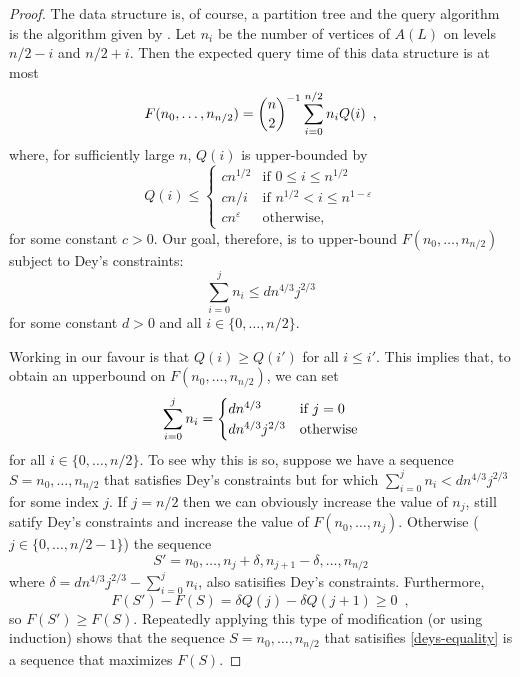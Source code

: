 \documentclass{patmorin}
\newcommand{\eps}{\varepsilon}
\begin{document}
\begin{proof}
  The data structure is, of course, a partition tree and the query
  algorithm is the algorithm given by .  Let $n_i$
  be the number of vertices of $A(L)$ on levels $n/2-i$ and $n/2+i$.
  Then the expected query time of this data structure is at most
  \begin{equation}
    F(n_0,\ldots,n_{n/2}) 
      = \binom{n}{2}^{-1}\sum_{i=0}^{n/2} n_i Q(i) \enspace ,
     \eqlabel{expected}
  \end{equation}
  where, for sufficiently large $n$, $Q(i)$ is upper-bounded by
  \[
        Q(i) \le \begin{cases}
          cn^{1/2} & \text{if $0\le i \le n^{1/2}$} \\
          cn/i      & \text{if $n^{1/2} < i \le n^{1-\eps}$} \\
          cn^{\eps} & \text{otherwise,}
        \end{cases}
  \]
  for some constant $c>0$.   Our goal, therefore, is to
  upper-bound $F(n_0,\ldots,n_{n/2})$ subject to Dey's constraints:
  \[
     \sum_{i=0}^{j}n_i \le dn^{4/3}j^{2/3} 
  \]
  for some constant $d>0$ and all $i\in\{0,\ldots,n/2\}$.

  Working in our favour is that $Q(i) \ge Q(i')$ for all $i \le i'$.
  This implies that, to obtain an upperbound on $F(n_0,\ldots,n_{n/2})$,
  we can set
  \begin{equation}
      \sum_{i=0}^{j}n_i = 
        \begin{cases}
           dn^{4/3} & \text{if $j=0$} \\
           dn^{4/3}j^{2/3} & \text{otherwise}
        \end{cases}  \eqlabel{deys-equality}
  \end{equation}
  for all $i\in\{0,\ldots,n/2\}$.  To see why this is so, suppose we have
  a sequence $S=n_0,\ldots,n_{n/2}$ that satisfies Dey's constraints
  but for which $\sum_{i=0}^{j}n_i < dn^{4/3}j^{2/3}$ for some index
  $j$. If $j=n/2$ then we can obviously increase the value of $n_j$, still
  satify Dey's constraints and increase the value of $F(n_0,\ldots,n_j)$.
  Otherwise ($j\in\{0,\ldots,n/2-1\}$) the sequence
  \[
     S'=n_0,\ldots,n_{j}+\delta,n_{j+1}-\delta,\ldots,n_{n/2}
  \]
  where $\delta=dn^{4/3}j^{2/3}-\sum_{i=0}^{j}n_i$, also satisifies
  Dey's constraints.  Furthermore, 
  \[  F(S')-F(S) = \delta Q(j) - \delta Q(j+1) \ge 0 \enspace , \]
  so $F(S')\ge F(S)$.  Repeatedly applying this type of modification (or
  using induction) shows that the sequence $S=n_0,\ldots,n_{n/2}$ that
  satisifies \eqref{deys-equality} is a sequence that maximizes $F(S)$.


\end{proof}
\end{document}
